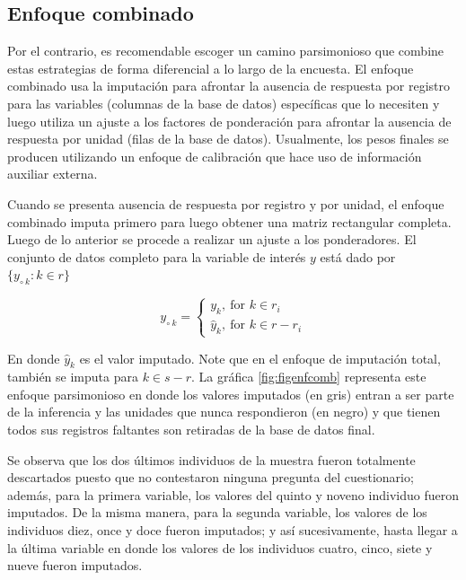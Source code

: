 \documentclass[
  12pt,
  spanish,
]{book}
\begin{document}
\hypertarget{enfoque-combinado}{%
\subsection{Enfoque combinado}\label{enfoque-combinado}}

Por el contrario, es recomendable escoger un camino parsimonioso que combine estas estrategias de forma diferencial a lo largo de la encuesta. El enfoque combinado usa la imputación para afrontar la ausencia de respuesta por registro para las variables (columnas de la base de datos) específicas que lo necesiten y luego utiliza un ajuste a los factores de ponderación para afrontar la ausencia de respuesta por unidad (filas de la base de datos). Usualmente, los pesos finales se producen utilizando un enfoque de calibración que hace uso de información auxiliar externa.

Cuando se presenta ausencia de respuesta por registro y por unidad, el enfoque combinado imputa primero para luego obtener una matriz rectangular completa. Luego de lo anterior se procede a realizar un ajuste a los ponderadores. El conjunto de datos completo para la variable de interés \(y\) está dado por \(\{y_{\circ \  k}: k\in r\}\)

\[
y_{\circ \  k} = 
\begin{cases}
y_k, \ \text{for $k \in r_i$} \\
\hat{y}_k, \ \text{for $k \in r - r_i$}
\end{cases}
\]

En donde \(\hat{y}_k\) es el valor imputado. Note que en el enfoque de imputación total, también se imputa para \(k \in s-r\). La gráfica \ref{fig:figenfcomb} representa este enfoque parsimonioso en donde los valores imputados (en gris) entran a ser parte de la inferencia y las unidades que nunca respondieron (en negro) y que tienen todos sus registros faltantes son retiradas de la base de datos final.

Se observa que los dos últimos individuos de la muestra fueron totalmente descartados puesto que no contestaron ninguna pregunta del cuestionario; además, para la primera variable, los valores del quinto y noveno individuo fueron imputados. De la misma manera, para la segunda variable, los valores de los individuos diez, once y doce fueron imputados; y así sucesivamente, hasta llegar a la última variable en donde los valores de los individuos cuatro, cinco, siete y nueve fueron imputados.
\end{document}
